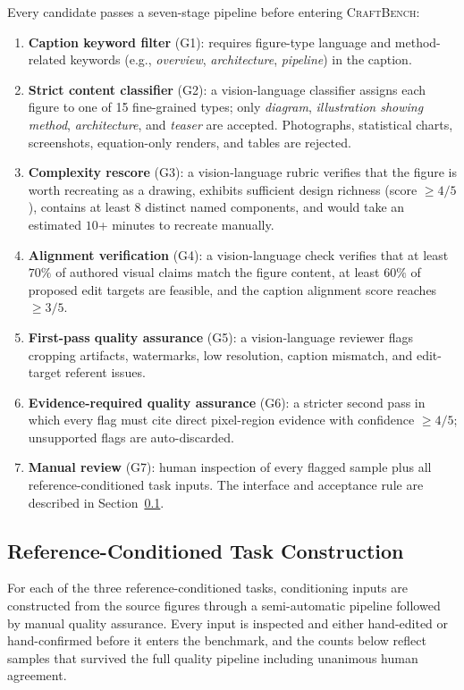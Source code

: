 \documentclass{llmxive}
\providecommand{\CrafterBench}{\textsc{CraftBench}\xspace}
\begin{document}
Every candidate passes a seven-stage pipeline before entering \CrafterBench:
\begin{enumerate}[leftmargin=1.5em, itemsep=0pt, topsep=0pt, parsep=0pt]
    \item \textbf{Caption keyword filter} (G1): requires figure-type language and method-related keywords (e.g., \textit{overview}, \textit{architecture}, \textit{pipeline}) in the caption.
    \item \textbf{Strict content classifier} (G2): a vision-language classifier assigns each figure to one of 15 fine-grained types; only \textit{diagram}, \textit{illustration showing method}, \textit{architecture}, and \textit{teaser} are accepted. Photographs, statistical charts, screenshots, equation-only renders, and tables are rejected.
    \item \textbf{Complexity rescore} (G3): a vision-language rubric verifies that the figure is worth recreating as a drawing, exhibits sufficient design richness (score $\geq 4/5$), contains at least $8$ distinct named components, and would take an estimated $10$+ minutes to recreate manually.
    \item \textbf{Alignment verification} (G4): a vision-language check verifies that at least $70\%$ of authored visual claims match the figure content, at least $60\%$ of proposed edit targets are feasible, and the caption alignment score reaches $\geq 3/5$.
    \item \textbf{First-pass quality assurance} (G5): a vision-language reviewer flags cropping artifacts, watermarks, low resolution, caption mismatch, and edit-target referent issues.
    \item \textbf{Evidence-required quality assurance} (G6): a stricter second pass in which every flag must cite direct pixel-region evidence with confidence $\geq 4/5$; unsupported flags are auto-discarded.
    \item \textbf{Manual review} (G7): human inspection of every flagged sample plus all reference-conditioned task inputs. The interface and acceptance rule are described in Section~\ref{app:bench-edit-construction}.
\end{enumerate}

\subsection{Reference-Conditioned Task Construction}
\label{app:bench-edit-construction}

For each of the three reference-conditioned tasks, conditioning inputs are constructed from the source figures through a semi-automatic pipeline followed by manual quality assurance. Every input is inspected and either hand-edited or hand-confirmed before it enters the benchmark, and the counts below reflect samples that survived the full quality pipeline including unanimous human agreement.
\end{document}
